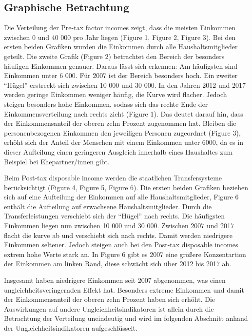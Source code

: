 \documentclass[12pt,]{article}
\begin{document}
\subsection{Graphische Betrachtung}\label{graphische-betrachtung}

Die Verteilung der Pre-tax factor incomes zeigt, dass die meisten
Einkommen zwischen 0 und 40 000 pro Jahr liegen (Figure 1, Figure 2,
Figure 3). Bei den ersten beiden Grafiken wurden die Einkommen durch
alle Haushaltsmitglieder geteilt. Die zweite Grafik (Figure 2)
betrachtet den Bereich der besonders häufigen Einkommen genauer. Daraus
lässt sich erkennen: Am häufigsten sind Einkommen unter 6 000. Für 2007
ist der Bereich besonders hoch. Ein zweiter ``Hügel'' erstreckt sich
zwischen 10 000 und 30 000. In den Jahren 2012 und 2017 werden geringe
Einkommen weniger häufig, die Kurve wird flacher. Jedoch steigen
besonders hohe Einkommen, sodass sich das rechte Ende der
Einkommensverteilung nach rechts zieht (Figure 1). Das deutet darauf
hin, dass der Einkommensanteil der oberen zehn Prozent zugenommen hat.
Bleiben die personenbezogenen Einkommen den jeweiligen Personen
zugeordnet (Figure 3), erhöht sich der Anteil der Menschen mit einem
Einkommen unter 6000, da es in dieser Aufteilung einen geringeren
Ausgleich innerhalb eines Haushaltes zum Beispiel bei Ehepartner/innen
gibt.

Beim Post-tax disposable income werden die staatlichen Transfersysteme
berücksichtigt (Figure 4, Figure 5, Figure 6). Die ersten beiden
Grafiken beziehen sich auf eine Aufteilung der Einkommen auf alle
Haushaltsmitglieder, Figure 6 enthält die Aufteilung auf erwachsene
Haushaltsmitglieder. Durch die Transferleistungen verschiebt sich der
``Hügel'' nach rechts. Die häufigsten Einkommen liegen nun zwischen 10
000 und 30 000. Zwischen 2007 und 2017 flacht die kurve ab und
verschiebt sich nach rechts. Damit werden niedrigere Einkommen seltener.
Jedoch steigen auch bei den Post-tax disposable incomes extrem hohe
Werte stark an. In Figure 6 gibt es 2007 eine größere Konzentartion der
Einkommen am linken Rand, diese schwächt sich über 2012 bis 2017 ab.

Insgesamt haben niedrigere Einkommen seit 2007 abgenommen, was einen
ungleichheitsveringernden Effekt hat. Besonders extreme Einkommen und
damit der Einkommensanteil der oberen zehn Prozent haben sich erhöht.
Die Auswirkungen auf andere Ungleichheitsindikatoren ist allein durch
die Betrachtung der Verteilung uneindeutig und wird im folgenden
Abschnitt anhand der Ungleichheitsindikatoren aufgeschlüsselt.
\end{document}
